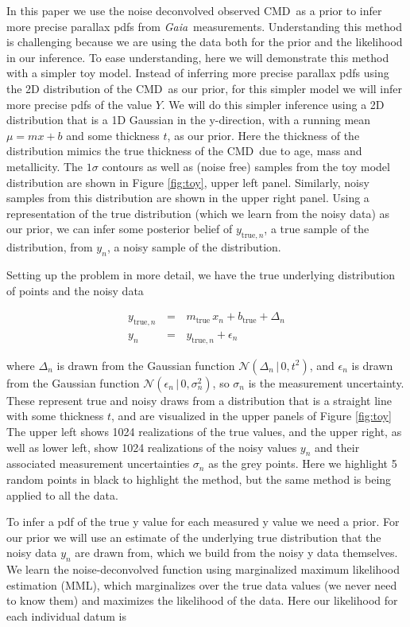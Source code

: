 \documentclass[modern]{aastex61}
\newcommand{\acronym}[1]{{\small{#1}}}
\newcommand{\project}[1]{\textsl{#1}}
\newcommand{\gaia}{\project{Gaia}}
\newcommand{\cmd}{\acronym{CMD}}
\newcommand{\given}{\,|\,}
\newcommand{\true}{\mathrm{true}}
\begin{document}
In this paper we use the noise deconvolved observed \cmd\ as a prior to infer more precise parallax pdfs from \gaia\ measurements.
Understanding this method is challenging because we are using the data both for the prior and the likelihood in our inference.
To ease understanding, here we will demonstrate this method with a simpler toy model.
Instead of inferring more precise parallax pdfs using the 2D distribution of the \cmd\ as our prior, for this simpler model we will infer more precise pdfs of the value $Y$.
We will do this simpler inference using a 2D distribution that is a 1D Gaussian in the y-direction, with a running mean $\mu = mx + b$ and some thickness $t$, as our prior.
Here the thickness of the distribution mimics the true thickness of the \cmd\ due to age, mass and metallicity.
The $1\sigma$ contours as well as (noise free) samples from the toy model distribution are shown in Figure \ref{fig:toy}, upper left panel.
Similarly, noisy samples from this distribution are shown in the upper right panel.
Using a representation of the true distribution (which we learn from the noisy data) as our prior, we can infer some posterior belief of $y_{\true,n}$, a true sample of the distribution, from $y_n$, a noisy sample of the distribution.

Setting up the problem in more detail, we have the true underlying distribution of points and the noisy data

\begin{eqnarray}
y_{\true, n} \, &=& \, m_{\true}\,x_n + b_{\true} + \Delta_n \\
y_n \, &=& \, y_{\true,n} + \epsilon_n
\label{eq:ytrue}
\end{eqnarray}

where $\Delta_n$ is drawn from the Gaussian function $\mathcal{N}(\Delta_n \given 0, t^2)$, and $\epsilon_n$ is drawn from the Gaussian function $\mathcal{N}(\epsilon_n \given 0, \sigma_n^2)$, so $\sigma_n$ is the measurement uncertainty.
These represent true and noisy draws from a distribution that is a straight line with some thickness $t$, and are visualized in the upper panels of Figure \ref{fig:toy}
The upper left shows 1024 realizations of the true values, and the upper right, as well as lower left, show 1024 realizations of the noisy values $y_n$ and their associated measurement uncertainties $\sigma_n$ as the grey points. Here we highlight 5 random points in black to highlight the method, but the same method is being applied to all the data.

To infer a pdf of the true y value for each measured y value we need a prior. For our prior we will use an estimate of the underlying true distribution that the noisy data $y_n$ are drawn from, which we build from the noisy y data themselves.
We learn the noise-deconvolved function using marginalized maximum likelihood estimation (MML), which marginalizes over the true data values (we never need to know them) and maximizes the likelihood of the data. Here our likelihood for each individual datum is
\end{document}
